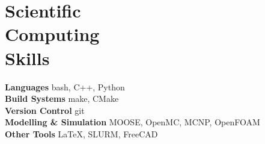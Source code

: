 \section{\mysidestyle Scientific\\Computing\\Skills}
\textbf{Languages} \hfill bash, C++, Python\vspace{.5mm}\\%
\textbf{Build Systems} \hfill make, CMake\vspace{.5mm}\\%
\textbf{Version Control} \hfill git\vspace{.5mm}\\%
\textbf{Modelling \& Simulation} \hfill MOOSE, OpenMC, MCNP, OpenFOAM \\\vspace{.5mm}%
\textbf{Other Tools} \hfill \LaTeX, SLURM, FreeCAD\vspace{.5mm}%

